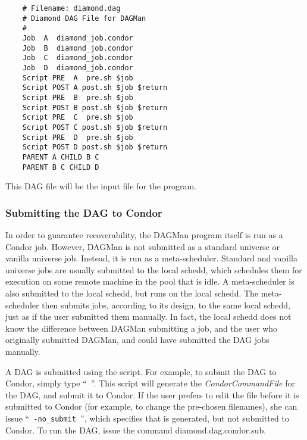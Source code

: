 \begin{verbatim}
	# Filename: diamond.dag
	# Diamond DAG File for DAGMan
	#
	Job  A  diamond_job.condor
	Job  B  diamond_job.condor
	Job  C  diamond_job.condor
	Job  D  diamond_job.condor
	Script PRE  A  pre.sh $job
	Script POST A post.sh $job $return
	Script PRE  B  pre.sh $job
	Script POST B post.sh $job $return
	Script PRE  C  pre.sh $job
	Script POST C post.sh $job $return
	Script PRE  D  pre.sh $job
	Script POST D post.sh $job $return
	PARENT A CHILD B C
	PARENT B C CHILD D
\end{verbatim}

This DAG file will be the input file for the  program.

\subsubsection{\label{dagman:submitdag}Submitting the DAG to Condor}

In order to guarantee recoverability, the DAGMan program itself is run as a
Condor job.  However, DAGMan is not submitted as a standard universe or
vanilla universe job.  Instead, it is run as a meta-scheduler.  Standard and
vanilla universe jobs are usually submitted to the local schedd, which
schedules them for execution on some remote machine in the pool that is idle.
A meta-scheduler is also submitted to the local schedd, but runs on the local
schedd.  The meta-scheduler then submits jobs, according to its design, to the
same local schedd, just as if the user submitted them manually.  In fact, the
local schedd does not know the difference between DAGMan submitting a job, and
the user who originally submitted DAGMan, and could have submitted the DAG
jobs manually.

A DAG is submitted using the  script.  For
example, to submit the  DAG to Condor, simply type
``{\tt {} }''.
This script will generate the 
\textit{CondorCommandFile} for the DAG, and submit it to Condor.
If the user prefers to edit the  file before
it is submitted to Condor (for example, to change the pre-chosen
filenames), she can issue ``{\tt {} -no\_submit
}'', which specifies that 
is generated, but not submitted to Condor.
To run the DAG, issue the command 
diamond.dag.condor.sub. 

